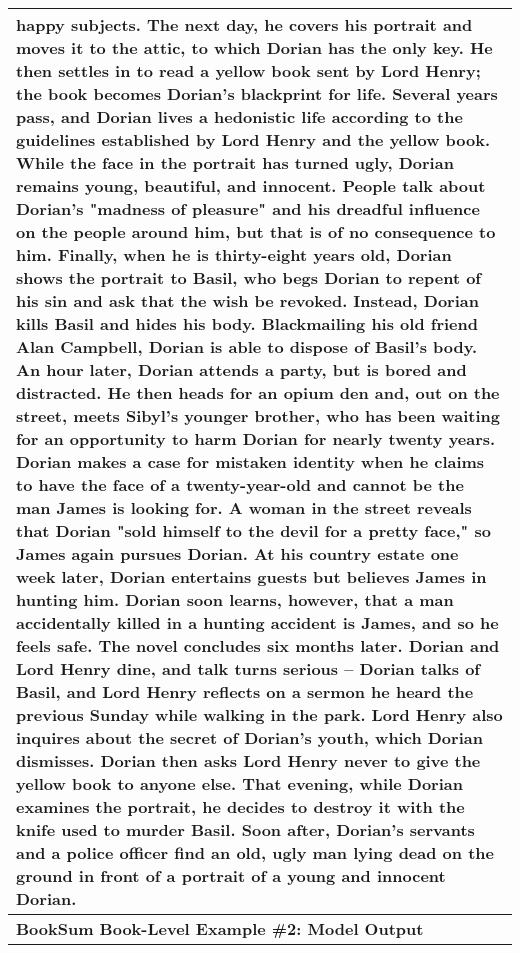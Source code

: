 \documentclass{article} \usepackage{iclr2022_conference,times}
\begin{document}
\begin{table}[!htbp]
\begin{tabular}{p{\linewidth}}
happy subjects. The next day, he covers his portrait and moves it to the attic, to which Dorian has the only key. He then settles in to read a yellow book sent by Lord Henry; the book becomes Dorian's blackprint for life. Several years pass, and Dorian lives a hedonistic life according to the guidelines established by Lord Henry and the yellow book. While the face in the portrait has turned ugly, Dorian remains young, beautiful, and innocent. People talk about Dorian's "madness of pleasure" and his dreadful influence on the people around him, but that is of no consequence to him. Finally, when he is thirty-eight years old, Dorian shows the portrait to Basil, who begs Dorian to repent of his sin and ask that the wish be revoked. Instead, Dorian kills Basil and hides his body. Blackmailing his old friend Alan Campbell, Dorian is able to dispose of Basil's body. An hour later, Dorian attends a party, but is bored and distracted. He then heads for an opium den and, out on the street, meets Sibyl's younger brother, who has been waiting for an opportunity to harm Dorian for nearly twenty years. Dorian makes a case for mistaken identity when he claims to have the face of a twenty-year-old and cannot be the man James is looking for. A woman in the street reveals that Dorian "sold himself to the devil for a pretty face," so James again pursues Dorian. At his country estate one week later, Dorian entertains guests but believes James in hunting him. Dorian soon learns, however, that a man accidentally killed in a hunting accident is James, and so he feels safe. The novel concludes six months later. Dorian and Lord Henry dine, and talk turns serious -- Dorian talks of Basil, and Lord Henry reflects on a sermon he heard the previous Sunday while walking in the park. Lord Henry also inquires about the secret of Dorian's youth, which Dorian dismisses. Dorian then asks Lord Henry never to give the yellow book to anyone else. That evening, while Dorian examines the portrait, he decides to destroy it with the knife used to murder Basil. Soon after, Dorian's servants and a police officer find an old, ugly man lying dead on the ground in front of a portrait of a young and innocent Dorian.
    \\
    \midrule
    \textbf{BookSum Book-Level Example \#2: Model Output} \\
    \midrule

\end{tabular}
\end{table}
\end{document}
